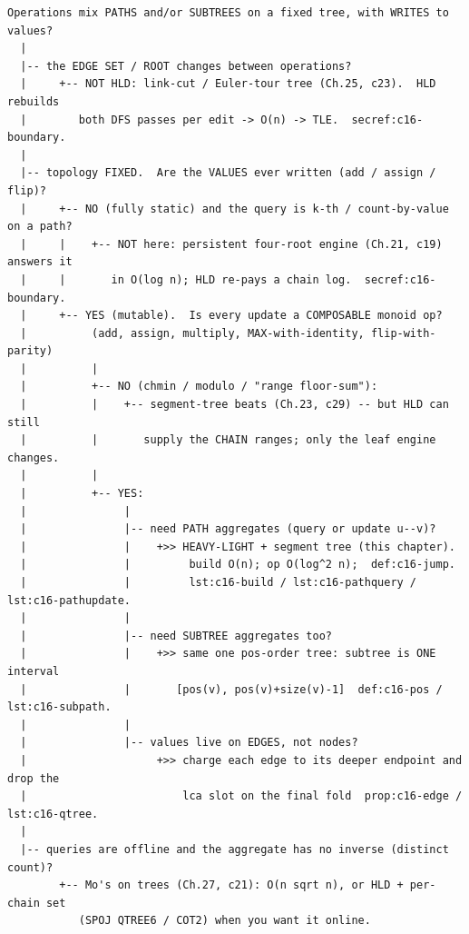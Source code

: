 \begin{lstlisting}[language={}, basicstyle=\ttfamily\small, numbers=none, frame=single]
  Operations mix PATHS and/or SUBTREES on a fixed tree, with WRITES to values?
  |
  |-- the EDGE SET / ROOT changes between operations?
  |     +-- NOT HLD: link-cut / Euler-tour tree (Ch.25, c23).  HLD rebuilds
  |        both DFS passes per edit -> O(n) -> TLE.  secref:c16-boundary.
  |
  |-- topology FIXED.  Are the VALUES ever written (add / assign / flip)?
  |     +-- NO (fully static) and the query is k-th / count-by-value on a path?
  |     |    +-- NOT here: persistent four-root engine (Ch.21, c19) answers it
  |     |       in O(log n); HLD re-pays a chain log.  secref:c16-boundary.
  |     +-- YES (mutable).  Is every update a COMPOSABLE monoid op?
  |          (add, assign, multiply, MAX-with-identity, flip-with-parity)
  |          |
  |          +-- NO (chmin / modulo / "range floor-sum"):
  |          |    +-- segment-tree beats (Ch.23, c29) -- but HLD can still
  |          |       supply the CHAIN ranges; only the leaf engine changes.
  |          |
  |          +-- YES:
  |               |
  |               |-- need PATH aggregates (query or update u--v)?
  |               |    +>> HEAVY-LIGHT + segment tree (this chapter).
  |               |         build O(n); op O(log^2 n);  def:c16-jump.
  |               |         lst:c16-build / lst:c16-pathquery / lst:c16-pathupdate.
  |               |
  |               |-- need SUBTREE aggregates too?
  |               |    +>> same one pos-order tree: subtree is ONE interval
  |               |       [pos(v), pos(v)+size(v)-1]  def:c16-pos / lst:c16-subpath.
  |               |
  |               |-- values live on EDGES, not nodes?
  |                    +>> charge each edge to its deeper endpoint and drop the
  |                        lca slot on the final fold  prop:c16-edge / lst:c16-qtree.
  |
  |-- queries are offline and the aggregate has no inverse (distinct count)?
        +-- Mo's on trees (Ch.27, c21): O(n sqrt n), or HLD + per-chain set
           (SPOJ QTREE6 / COT2) when you want it online.
\end{lstlisting}



